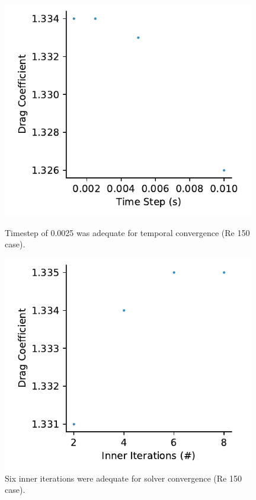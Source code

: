 \documentclass[10pt,english]{article}
\begin{document}
\begin{figure}[h!]
\centering
\begin{minipage}{.47\textwidth}
  \centering
\includegraphics[trim={0.0cm 0cm 0.0cm 0cm},clip,width=0.98\textwidth]{timestep150}
\vspace{3pt}
\caption{Timestep of 0.0025 was adequate for temporal convergence (Re 150 case).}
\label{f:timestep150}
\end{minipage}%
\hspace{10pt}
\begin{minipage}{.47\textwidth}
  \centering
\includegraphics[trim={0.0cm 0cm 0.0cm 0cm},clip,width=0.98\textwidth]{II150}
\caption{Six inner iterations were adequate for solver convergence (Re 150 case).}
\label{f:II150}
\end{minipage}
\end{figure}
\end{document}
